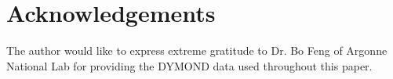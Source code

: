 \section*{Acknowledgements}
\label{acknow}
The author would like to express extreme gratitude to Dr. Bo Feng of
Argonne National Lab for providing the DYMOND data used throughout this 
paper.
